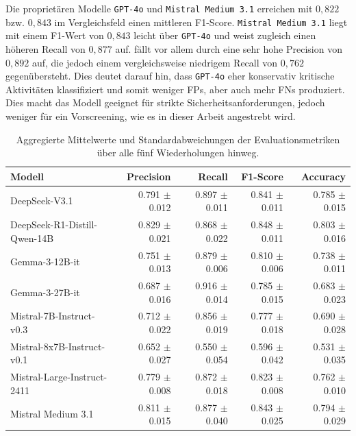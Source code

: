 Die proprietären Modelle \texttt{GPT-4o} und \texttt{Mistral Medium 3.1} erreichen mit $0{,}822$ bzw. $0{,}843$ im Vergleichsfeld einen mittleren F1-Score. \texttt{Mistral Medium 3.1} liegt mit
einem F1-Wert von $0{,}843$ leicht über \texttt{GPT-4o} und weist zugleich
einen höheren Recall von $0{,}877$ auf.  fällt vor allem durch eine sehr hohe Precision von $0{,}892$ auf, die jedoch einem vergleichsweise niedrigem Recall von $0{,}762$ gegenübersteht. Dies deutet darauf hin, dass \texttt{GPT-4o} eher konservativ kritische Aktivitäten klassifiziert und somit weniger \acp{FP}, aber auch mehr \acp{FN} produziert. Dies
macht das Modell geeignet für strikte Sicherheitsanforderungen, jedoch
weniger für ein Vorscreening, wie es in dieser Arbeit angestrebt wird.

\begin{table}[htbp]
    \centering
    \caption{Aggregierte Mittelwerte und Standardabweichungen der Evaluationsmetriken über alle fünf Wiederholungen hinweg.}
    \label{tab:metrics-overview}
    \begin{adjustbox}{width=\textwidth}
        \begin{tabular}{l r r r r}
            \toprule
            Modell & Precision & Recall & F1-Score & Accuracy \\
            \midrule
            DeepSeek-V3.1 & 0.791 $\pm$ 0.012 & 0.897 $\pm$ 0.011 & 0.841 $\pm$ 0.011 & 0.785 $\pm$ 0.015 \\
            DeepSeek-R1-Distill-Qwen-14B & 0.829 $\pm$ 0.021 & 0.868 $\pm$ 0.022 & 0.848 $\pm$ 0.011 & 0.803 $\pm$ 0.016 \\
            Gemma-3-12B-it & 0.751 $\pm$ 0.013 & 0.879 $\pm$ 0.006 & 0.810 $\pm$ 0.006 & 0.738 $\pm$ 0.011 \\
            Gemma-3-27B-it & 0.687 $\pm$ 0.016 & 0.916 $\pm$ 0.014 & 0.785 $\pm$ 0.015 & 0.683 $\pm$ 0.023 \\
            Mistral-7B-Instruct-v0.3 & 0.712 $\pm$ 0.022 & 0.856 $\pm$ 0.019 & 0.777 $\pm$ 0.018 & 0.690 $\pm$ 0.028 \\
            Mistral-8x7B-Instruct-v0.1 & 0.652 $\pm$ 0.027 & 0.550 $\pm$ 0.054 & 0.596 $\pm$ 0.042 & 0.531 $\pm$ 0.035 \\
            Mistral-Large-Instruct-2411 & 0.779 $\pm$ 0.008 & 0.872 $\pm$ 0.018 & 0.823 $\pm$ 0.008 & 0.762 $\pm$ 0.010 \\
            Mistral Medium 3.1 & 0.811 $\pm$ 0.015 & 0.877 $\pm$ 0.040 & 0.843 $\pm$ 0.025 & 0.794 $\pm$ 0.029 \\

\end{tabular}
\end{adjustbox}
\end{table}

